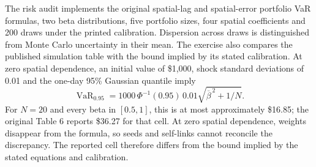 \documentclass[11pt]{article}
\begin{document}
\begin{table}[htbp]
  \centering\small
  
  \caption{Eligible and intersection cohorts for both return windows. The
    intersection holds firm identities fixed across timing comparisons;
  full eligible-sample estimates remain in the saved sensitivity results.}
\end{table}

\begin{table}[htbp]
  \centering\small
  
  \caption{Primary common-four residual diagnostics and fitted-value
    conventions. Raw Moran $I$ and standardized $z$ refer to OLS residuals.
    Conditional SEM fit includes the observed residual spatial lag; mean fit
    uses $X\widehat b$. Both fit columns are squared correlations between actual
  and fitted outcomes, rather than forecasting measures.}
\end{table}

The risk audit implements the original spatial-lag and spatial-error portfolio
VaR formulas, two beta distributions, five portfolio sizes, four spatial
coefficients and 200 draws under the printed calibration. Dispersion across
draws is distinguished from Monte Carlo uncertainty in their mean. The exercise
also compares the published simulation table with the bound implied by its
stated calibration. At zero
spatial dependence, an initial value of \$1,000, shock standard deviations of
0.01 and the one-day 95\% Gaussian quantile imply
\[
  \operatorname{VaR}_{0.95}
  =1000\,\Phi^{-1}(0.95)\,0.01\sqrt{\overline\beta^{\,2}+1/N}.
\]
For $N=20$ and every beta in $[0.5,1]$, this is at most approximately \$16.85;
the original Table 6 reports \$36.27 for that cell. At zero spatial dependence,
weights disappear from the formula, so seeds and self-links cannot reconcile
the discrepancy. The reported cell therefore differs from the bound
implied by the stated
equations and calibration.
\end{document}

